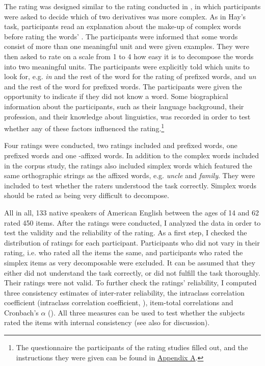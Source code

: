 The rating was designed similar to the rating conducted in \cite{Hay.2001}, in which participants were asked to decide which of two derivatives was more complex. As in Hay's task,  participants read an explanation about the make-up of complex words before rating the words' .  The participants were informed that some words consist of more than one meaningful unit and were given examples. 
They were then asked to rate on a scale from 1 to 4 how easy it is to decompose the words into two meaningful units. The participants were explicitly told which units to look for, e.g. \textit{in} and the rest of the word for the rating of prefixed words, and \textit{un} and the rest of the word for prefixed words. The participants were given the opportunity to  indicate if they did not know a word. 
Some biographical information about the participants, such as their language background, their profession, and their knowledge about linguistics, was recorded in order to test whether any of these factors influenced the rating.\footnote{The questionnaire the participants of the rating studies filled out, and the instructions they were given can be found in \hyperref[Appendix A: Decomposability Rating]{Appendix A}. } 

Four ratings were conducted, two ratings included  and prefixed words, one  prefixed words and one -affixed words. In addition to the complex words included in the corpus study, the ratings also included simplex words which featured the same orthographic strings as the affixed words, e.g. \textit{{un}cle} and \textit{fami{ly}}. They were included to test whether the raters understood the task correctly. Simplex words should be rated as being very difficult to decompose. 

All in all, 133 native speakers of American English between the ages of 14 and 62 rated 450 items. 
After the ratings were conducted, I analyzed the data in order to test the validity and the reliability of the rating. As a first step, I checked the distribution of ratings for each participant. Participants who did not vary in their rating, i.e. who rated all the items the same, and participants who rated the simplex items as very {decomposable} were excluded. It can be assumed that they either did not understand the task correctly, or did not fulfill the task thoroughly. Their ratings were not valid.
To further check the ratings' reliability, I computed three consistency estimates of inter-rater reliability, the intraclass correlation coefficient (intraclass correlation coefficient, \citealt{Bartko.1966}), item-total correlations and Cronbach's $\alpha$ (\citealt{Cronbach.1951}). All three measures can be used to test whether the subjects rated the items with internal consistency (see also \citealt[38ff.]{Stemler.2008} for discussion). 

